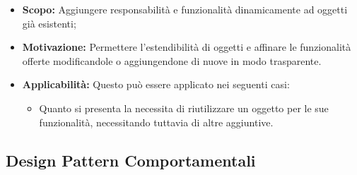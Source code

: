 \documentclass{scalatekids-article}
\begin{document}
\begin{itemize}

\item \textbf{Scopo:} Aggiungere responsabilità e funzionalità dinamicamente ad oggetti già esistenti;


\item \textbf{Motivazione:} Permettere l'estendibilità di oggetti e affinare le funzionalità offerte
  modificandole o aggiungendone di nuove in modo trasparente.

\item \textbf{Applicabilità:} Questo  può essere
  applicato nei seguenti casi:
  \begin{itemize}
  \item Quanto si presenta la necessita di riutilizzare un oggetto per le sue funzionalità, necessitando
    tuttavia di altre aggiuntive.
  \end{itemize}

\end{itemize}

\subsection{Design Pattern Comportamentali}
\end{document}
